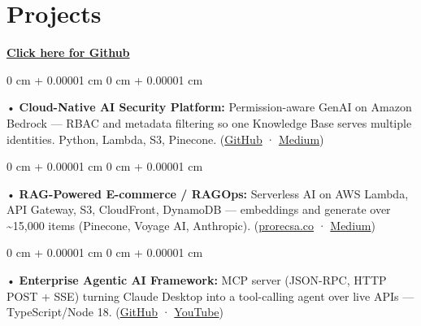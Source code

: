 \documentclass[10pt, letterpaper]{article}
\newenvironment{onecolentry}{
    \begin{adjustwidth}{
        0 cm + 0.00001 cm
    }{
        0 cm + 0.00001 cm
    }
}{
    \end{adjustwidth}
} %
\begin{document}
\section{Projects}
    \vspace{2 pt}
\textbf{\href{https://github.com/daedalus-s}{Click here for Github}}
\begin{onecolentry}
     • \textbf{Cloud-Native AI Security Platform:} Permission-aware GenAI on Amazon Bedrock --- RBAC and metadata filtering so one Knowledge Base serves multiple identities. Python, Lambda, S3, Pinecone. (\href{https://github.com/daedalus-s/bedrock-acl-metadata}{GitHub} · \href{https://medium.com/@sreenikethaathreya/building-a-permission-aware-genai-application-on-amazon-bedrock-8fdc2410dd43}{Medium})
\end{onecolentry}
\begin{onecolentry}
     • \textbf{RAG-Powered E-commerce / RAGOps:} Serverless AI on AWS Lambda, API Gateway, S3, CloudFront, DynamoDB --- embeddings and generate over \textasciitilde 15,000 items (Pinecone, Voyage AI, Anthropic). (\href{https://prorecsa.co}{prorecsa.co} · \href{https://medium.com/@sreenikethaathreya/from-rags-to-riches-bba8a671d5e6}{Medium})
\end{onecolentry}
\begin{onecolentry}
     • \textbf{Enterprise Agentic AI Framework:} MCP server (JSON-RPC, HTTP POST + SSE) turning Claude Desktop into a tool-calling agent over live APIs --- TypeScript/Node 18. (\href{https://github.com/daedalus-s/dota2-mcp-server}{GitHub} · \href{https://www.youtube.com/watch?v=op2gTYyFb5U}{YouTube})
\end{onecolentry}
\vspace{2 pt}
\end{document}
